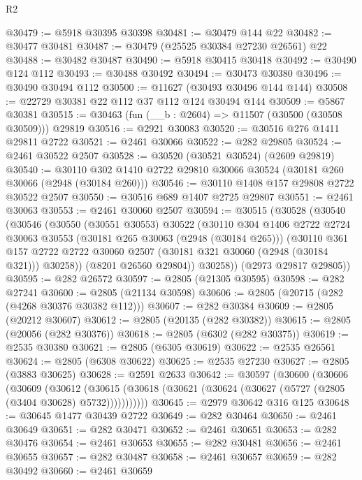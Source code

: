\begin{lexlean}{R2}
\begin{coremodule}
@30479 := @5918 @30395 @30398
@30481 := @30479 @144 @22
@30482 := @30477 @30481
@30487 := @30479 (@25525 @30384 @27230 @26561) @22
@30488 := @30482 @30487
@30490 := @5918 @30415 @30418
@30492 := @30490 @124 @112
@30493 := @30488 @30492
@30494 := @30473 @30380
@30496 := @30490 @30494 @112
@30500 := @11627 (@30493 @30496 @144 @144)
@30508 := @22729 @30381 @22 @112 @37 @112 @124 @30494 @144
@30509 := @5867 @30381
@30515 := @30463 (fun (__b : @2604) => @11507 (@30500 (@30508 @30509))) @29819
@30516 := @2921 @30083
@30520 := @30516 @276 @1411 @29811 @2722
@30521 := @2461 @30066
@30522 := @282 @29805
@30524 := @2461 @30522 @2507
@30528 := @30520 (@30521 @30524) (@2609 @29819)
@30540 := @30110 @302 @1410 @2722 @29810 @30066 @30524 (@30181 @260 @30066 (@2948 (@30184 @260)))
@30546 := @30110 @1408 @157 @29808 @2722 @30522 @2507
@30550 := @30516 @689 @1407 @2725 @29807
@30551 := @2461 @30063
@30553 := @2461 @30060 @2507
@30594 := @30515
    (@30528
      (@30540
        (@30546
          (@30550
            (@30551 @30553)
            @30522
            (@30110
              @304
              @1406
              @2722
              @2724
              @30063
              @30553
              (@30181 @265 @30063 (@2948 (@30184 @265)))
              (@30110
                @361
                @157
                @2722
                @2722
                @30060
                @2507
                (@30181 @321 @30060 (@2948 (@30184 @321)))
                @30258))
            (@8201 @26560 @29804))
          @30258))
      (@2973 @29817 @29805))
@30595 := @282 @26572
@30597 := @2805 (@21305 @30595)
@30598 := @282 @27241
@30600 := @2805 (@21134 @30598)
@30606 := @2805 (@20715 (@282 (@4268 @30376 @30382 @112)))
@30607 := @282 @30384
@30609 := @2805 (@20212 @30607)
@30612 := @2805 (@20135 (@282 @30382))
@30615 := @2805 (@20056 (@282 @30376))
@30618 := @2805 (@6302 (@282 @30375))
@30619 := @2535 @30380
@30621 := @2805 (@6305 @30619)
@30622 := @2535 @26561
@30624 := @2805 (@6308 @30622)
@30625 := @2535 @27230
@30627 := @2805 (@3883 @30625)
@30628 := @2591 @2633
@30642 := @30597
    (@30600
      (@30606
        (@30609
          (@30612
            (@30615 (@30618 (@30621 (@30624 (@30627 (@5727 (@2805 (@3404 @30628) @5732)))))))))))
@30645 := @2979 @30642 @316 @125
@30648 := @30645 @1477 @30439 @2722
@30649 := @282 @30464
@30650 := @2461 @30649
@30651 := @282 @30471
@30652 := @2461 @30651
@30653 := @282 @30476
@30654 := @2461 @30653
@30655 := @282 @30481
@30656 := @2461 @30655
@30657 := @282 @30487
@30658 := @2461 @30657
@30659 := @282 @30492
@30660 := @2461 @30659

\end{coremodule}
\end{lexlean}
